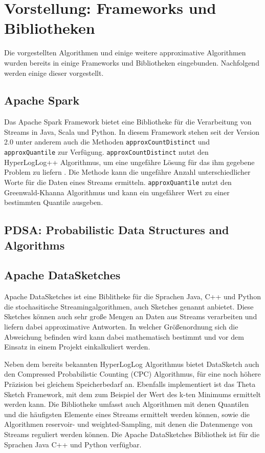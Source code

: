\section{Vorstellung: Frameworks und Bibliotheken}
Die vorgestellten Algorithmen und einige weitere approximative Algorithmen wurden bereits in einige Frameworks und Bibliotheken eingebunden. Nachfolgend werden einige dieser vorgestellt.

\subsection{Apache Spark}
Das Apache Spark Framework bietet eine Bibliotheke für die Verarbeitung von Streams in Java, Scala und Python. 
In diesem Framework stehen seit der Version 2.0 unter anderem auch die Methoden \texttt{approxCountDistinct} 
und \texttt{approxQuantile} zur Verfügung. 
\texttt{approxCountDistinct} nutzt den HyperLogLog++ Algorithmus, 
um eine ungefähre Lösung für das ihm gegebene Problem zu liefern \cite{hunter2016}.
Die Methode kann die ungefähre Anzahl unterschiedlicher Worte für die Daten eines Streams ermitteln.
\texttt{approxQuantile} nutzt den Greenwald-Khanna Algorithmus \cite{greenwald2001} 
und kann ein ungefährer Wert zu einer bestimmten Quantile ausgeben.




\subsection{PDSA: Probabilistic Data Structures and Algorithms}


\subsection{Apache DataSketches}
Apache DataSketches ist eine Biblitheke für die Sprachen Java, C++ und Python die stochasitische Streamingalgorithmen, 
auch Sketches genannt anbietet. 
Diese Sketches können auch sehr große Mengen an Daten aus Streams verarbeiten 
und liefern dabei approximative Antworten. 
In welcher Größenordnung sich die Abweichung befinden wird kann dabei mathematisch bestimmt 
und vor dem Einsatz in einem Projekt einkalkuliert werden.

Neben dem bereits bekannten HyperLogLog Algorithmus bietet DataSketch auch den Compressed Probabilistic Counting (CPC) Algorithmus, 
für eine noch höhere Präzision bei gleichem Speicherbedarf an.
Ebenfalls implementiert ist das Theta Sketch Framework, 
mit dem zum Beispiel der Wert des k-ten Minimums ermittelt werden kann.
Die Bibliotheke umfasst auch Algorithmen mit denen Quantilen und die häufigsten Elemente eines Streams ermittelt werden können, 
sowie die Algorithmen reservoir- und weighted-Sampling, mit denen die Datenmenge von Streams reguliert werden können.
Die Apache DataSketches Bibliothek ist für die Sprachen Java C++ und Python verfügbar.

